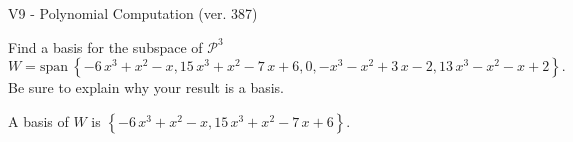\begin{exercise}
  \begin{exerciseTitle}V9 - Polynomial Computation (ver. 387)\end{exerciseTitle}
  \begin{exerciseStatement}
    Find a basis for the subspace of \(\mathcal{P}^3\) 
\[W=\mathrm{span}\ \left\{-6 \, x^{3} + x^{2} - x , 15 \, x^{3} + x^{2} - 7 \, x + 6 , 0 , -x^{3} - x^{2} + 3 \, x - 2 , 13 \, x^{3} - x^{2} - x + 2\right\}.\]
 Be sure to explain why your result is a basis.


  \end{exerciseStatement}
  \begin{exerciseAnswer}
   A basis of \(W\) is  \(\left\{-6 \, x^{3} + x^{2} - x , 15 \, x^{3} + x^{2} - 7 \, x + 6\right\}\).
  


  \end{exerciseAnswer}
\end{exercise}